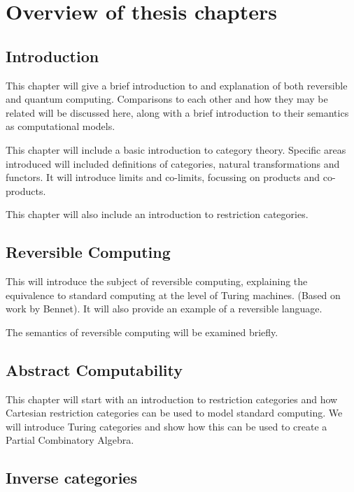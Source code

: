 \chapter*{Overview of thesis chapters}

\section*{Introduction}

This chapter will give a brief introduction to and explanation of both reversible and quantum
computing. Comparisons to each other and how they may be related will be discussed here, along
with a brief introduction to their semantics as computational models.

This chapter will include a basic introduction to category theory. Specific areas introduced will
included definitions of categories, natural transformations and functors. It will introduce limits
and co-limits, focussing on products and co-products.

This chapter will also include an introduction to restriction categories.

\section*{Reversible Computing}

This will introduce the subject of reversible computing, explaining the equivalence to standard
computing at the level of Turing machines. (Based on work by Bennet). It will also provide an
example of a reversible language.

The semantics of reversible computing will be examined briefly.

\section*{Abstract Computability}

This chapter will start with an introduction to restriction categories and how Cartesian restriction
categories can be used to model standard computing. We will introduce Turing categories and show how
this can be used to create a Partial Combinatory Algebra.

\section*{Inverse categories}

